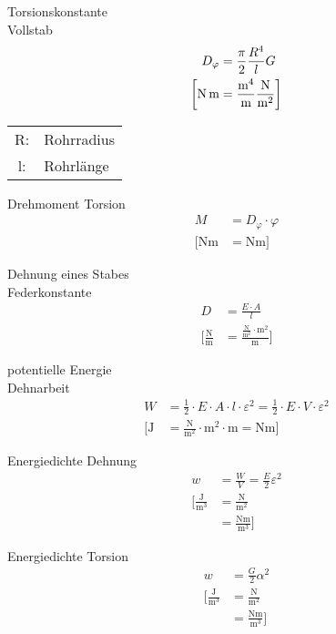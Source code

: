 \begin{karte}{Torsionskonstante\\Vollstab}
   \begin{align*}
       D_\varphi  &= \frac{\pi}{2} \frac{R^4}{l} G \\
       \bigg[ \si{\newton\meter} &= \frac{\si{\raiseto{4}\meter}}{\si{\meter}}\frac{\si{\newton}}{\si{\square\meter}} \bigg]
   \end{align*}
    \begin{tabular}[t]{cl}
        R: & Rohrradius \\
        l: & Rohrlänge
    \end{tabular}
\end{karte}

\begin{karte}{Drehmoment Torsion}
   \begin{align*}
       M &= D_\varphi \cdot \varphi \\
       \bigg[ \si{\newton\meter} &= \si{\newton\meter}\bigg]
   \end{align*}
\end{karte}

\begin{karte}{Dehnung eines Stabes \\ Federkonstante}
   \begin{align*}
       D &= \frac{E\cdot A}{l} \\
       \Bigg[ \frac{\si{\newton}}{\si{\meter}} &= \frac{\frac{\si{\newton}}{\si{\square\meter}} \cdot \si{\square\meter}}{\si{\meter}} \Bigg]
   \end{align*}
\end{karte}

\begin{karte}{potentielle Energie\\Dehnarbeit}
   \begin{align*}
       W &= \frac{1}{2} \cdot E \cdot A \cdot l \cdot \varepsilon^2 = \frac{1}{2} \cdot E \cdot V \cdot \varepsilon^2 \\
       \Bigg[ \si{\joule} &=  \frac{\si{\newton}}{\si{\square\meter}} \cdot \si{\square\meter} \cdot {\si{\meter}} = \si{\newton\meter} \Bigg]
   \end{align*}
\end{karte}

\begin{karte}{Energiedichte Dehnung}
   \begin{align*}
       w  &= \frac{W}{V} = \frac{E}{2} \varepsilon^2 \\
       \bigg[ \frac{\si{\joule}}{\si{\cubic\meter}} &= \frac{\si{\newton}}{\si{\square\meter}}  \\
           &= \frac{\si{\newton\meter}}{\si{\cubic\meter}}  \bigg]
   \end{align*}
\end{karte}

\begin{karte}{Energiedichte Torsion}
   \begin{align*}
       w  &= \frac{G}{2} \alpha^2 \\
       \bigg[ \frac{\si{\joule}}{\si{\cubic\meter}} &= \frac{\si{\newton}}{\si{\square\meter}}  \\
           &= \frac{\si{\newton\meter}}{\si{\cubic\meter}}  \bigg]
   \end{align*}
\end{karte}
